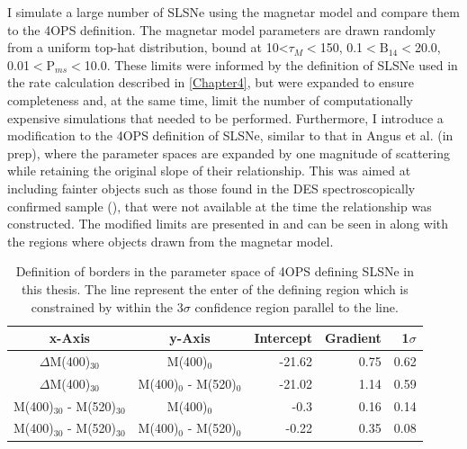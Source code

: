 I simulate a large number of SLSNe using the magnetar model and compare them to the 4OPS definition. The magnetar model parameters are drawn randomly from a uniform top-hat distribution, bound at 10<$\tau_M<$150, 0.1$<\mathrm{B}_{14}<$20.0, 0.01$<\mathrm{P}_{ms}<$10.0. These limits were informed by the definition of SLSNe used in the rate calculation described in \cref{Chapter4}, but were expanded to ensure completeness and, at the same time, limit the number of computationally expensive simulations that needed to be performed. Furthermore, I introduce a modification to the 4OPS definition of SLSNe, similar to that in Angus et al. (in prep), where the parameter spaces are expanded by one magnitude of scattering while retaining the original slope of their relationship. This was aimed at including fainter objects such as those found in the DES spectroscopically confirmed sample (), that were not available at the time the relationship was constructed. The modified limits are presented in  and can be seen in  along with the regions where objects drawn from the magnetar model.

\begin{table}
  \caption{Definition of borders in the parameter space of 4OPS defining SLSNe in this thesis. The line represent the enter of the defining region which is constrained by within the 3$\sigma$ confidence region parallel to the line.}
  \label{tab:4OPS}
  \begin{tabular}{|c|c|r|r|r|}
    \hline
    x-Axis & y-Axis & Intercept & Gradient & 1$\sigma$ \\
    \hline
    $\Delta$M(400)$_{30}$ & M(400)$_0$ & -21.62 & 0.75 & 0.62 \\
    $\Delta$M(400)$_{30}$ & M(400)$_0$ - M(520)$_0$ & -21.02 & 1.14 & 0.59 \\
    M(400)$_{30}$ - M(520)$_{30}$ & M(400)$_0$ & -0.3 & 0.16 & 0.14 \\
    M(400)$_{30}$ - M(520)$_{30}$ & M(400)$_0$ - M(520)$_0$ & -0.22 & 0.35 & 0.08 \\
    \hline
  \end{tabular}
\end{table}

